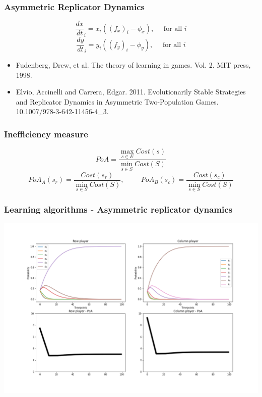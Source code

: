 \begin{frame}
    \frametitle{Asymmetric Replicator Dynamics}
    \centering

    \[
        \frac{dx}{dt}_i = x_i((f_x)_i - \phi_x), \quad \text{ for all }i
    \]
    \[
        \frac{dy}{dt}_i = y_i((f_y)_i - \phi_y), \quad \text{ for all }i
    \]
    
    \vspace{1cm}
    \begin{itemize}
        \item Fudenberg, Drew, et al. The theory of learning in games. Vol. 2. MIT press, 1998.
        \item Elvio, Accinelli and Carrera, Edgar. 2011. Evolutionarily Stable Strategies and Replicator Dynamics in Asymmetric Two-Population Games. 10.1007/978-3-642-11456-4\_3.
    \end{itemize}
\end{frame}


\begin{frame}
    \frametitle{Inefficiency measure}

    \begin{equation*}
        PoA = \frac{\max_{s \in E} Cost(s)}{\min_{s \in S} Cost(S)}
    \end{equation*}
    \pause
    \footnotesize
    \vspace{1cm}
    \begin{equation*}
        PoA_A(s_r) = \frac{Cost(s_r)}{\min_{s \in S} Cost(S)}, \hspace{1cm} 
        PoA_B(s_c) = \frac{Cost(s_c)}{\min_{s \in S} Cost(S)}
    \end{equation*}
\end{frame}


\begin{frame}
    \frametitle{Learning algorithms - Asymmetric replicator dynamics}

    \includegraphics[scale=0.28]{Bin/ARD_game.png}
\end{frame}

